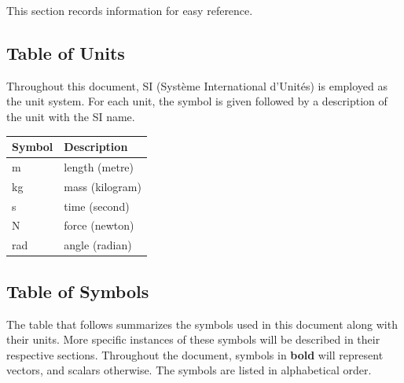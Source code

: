 \documentclass[12pt]{article}
\begin{document}
This section records information for easy reference.


\subsection{Table of Units} \label{TblOfUnits}

Throughout this document, SI (Syst\`{e}me International d'Unit\'{e}s) is employed
as the unit system. For each unit, the symbol is given followed by a
description of the unit with the SI name. \\  

\begin{longtable*}{l l}
	\toprule
	Symbol & Description
	\\
	\midrule
	m & length (metre)
	\\
	kg & mass (kilogram)
	\\
	s & time (second)
	\\
	N & force (newton)
	\\
	rad & angle (radian)
	\\
	\bottomrule
	
\end{longtable*}


\subsection{Table of Symbols} \label{TblOfSym}


The table that follows summarizes the symbols used in this document along with
their units. More specific instances of these symbols will be described in their respective sections. Throughout the document, symbols in \textbf{bold} will represent vectors, and scalars otherwise. The symbols are listed in alphabetical order.
\end{document}
